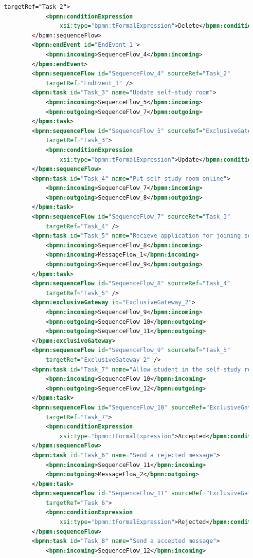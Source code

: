 \documentclass[runningheads]{llncs}
\begin{document}
\begin{lstlisting}[language={XML}]
			targetRef="Task_2">
			<bpmn:conditionExpression
				xsi:type="bpmn:tFormalExpression">Delete</bpmn:conditionExpression>
		</bpmn:sequenceFlow>
		<bpmn:endEvent id="EndEvent_1">
			<bpmn:incoming>SequenceFlow_4</bpmn:incoming>
		</bpmn:endEvent>
		<bpmn:sequenceFlow id="SequenceFlow_4" sourceRef="Task_2"
	        targetRef="EndEvent_1" />
		<bpmn:task id="Task_3" name="Update self-study room">
	        <bpmn:incoming>SequenceFlow_5</bpmn:incoming>
	        <bpmn:outgoing>SequenceFlow_7</bpmn:outgoing>
	    </bpmn:task>
		<bpmn:sequenceFlow id="SequenceFlow_5" sourceRef="ExclusiveGateway_1"
			targetRef="Task_3">
			<bpmn:conditionExpression
				xsi:type="bpmn:tFormalExpression">Update</bpmn:conditionExpression>
		</bpmn:sequenceFlow>
		<bpmn:task id="Task_4" name="Put self-study room online">
	        <bpmn:incoming>SequenceFlow_7</bpmn:incoming>
	        <bpmn:outgoing>SequenceFlow_8</bpmn:outgoing>
	    </bpmn:task>
		<bpmn:sequenceFlow id="SequenceFlow_7" sourceRef="Task_3"
	        targetRef="Task_4" />
		<bpmn:task id="Task_5" name="Recieve application for joining self-study room">
	        <bpmn:incoming>SequenceFlow_8</bpmn:incoming>
			<bpmn:incoming>MessageFlow_1</bpmn:incoming>
	        <bpmn:outgoing>SequenceFlow_9</bpmn:outgoing>
	    </bpmn:task>
		<bpmn:sequenceFlow id="SequenceFlow_8" sourceRef="Task_4"
	        targetRef="Task_5" />
		<bpmn:exclusiveGateway id="ExclusiveGateway_2">
			<bpmn:incoming>SequenceFlow_9</bpmn:incoming>
	        <bpmn:outgoing>SequenceFlow_10</bpmn:outgoing>
			<bpmn:outgoing>SequenceFlow_11</bpmn:outgoing>
		</bpmn:exclusiveGateway>
		<bpmn:sequenceFlow id="SequenceFlow_9" sourceRef="Task_5"
	        targetRef="ExclusiveGateway_2" />
		<bpmn:task id="Task_7" name="Allow student in the self-study room">
	        <bpmn:incoming>SequenceFlow_10</bpmn:incoming>
	        <bpmn:outgoing>SequenceFlow_12</bpmn:outgoing>
	    </bpmn:task>
		<bpmn:sequenceFlow id="SequenceFlow_10" sourceRef="ExclusiveGateway_2"
			targetRef="Task_7">
			<bpmn:conditionExpression
				xsi:type="bpmn:tFormalExpression">Accepted</bpmn:conditionExpression>
		</bpmn:sequenceFlow>	
		<bpmn:task id="Task_6" name="Send a rejected message">
	        <bpmn:incoming>SequenceFlow_11</bpmn:incoming>
	        <bpmn:outgoing>MessageFlow_2</bpmn:outgoing>
	    </bpmn:task>
		<bpmn:sequenceFlow id="SequenceFlow_11" sourceRef="ExclusiveGateway_2"
			targetRef="Task_6">
			<bpmn:conditionExpression
				xsi:type="bpmn:tFormalExpression">Rejected</bpmn:conditionExpression>
		</bpmn:sequenceFlow>
		<bpmn:task id="Task_8" name="Send a accepted message">
	        <bpmn:incoming>SequenceFlow_12</bpmn:incoming>

\end{lstlisting}
\end{document}
